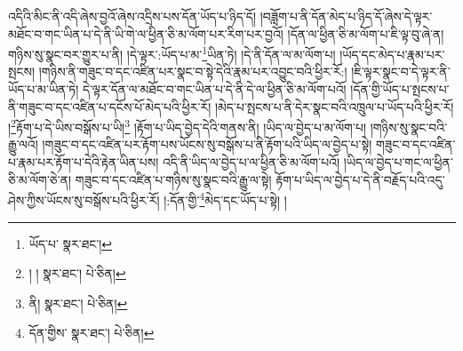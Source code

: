 འདིའི་མིང་ནི་འདི་ཞེས་བྱའོ་ཞེས་འདྲིས་པས་དོན་ཡོད་པ་ཉིད་དོ། །བཟློག་པ་ནི་དོན་མེད་པ་ཉིད་དོ་ཞེས་དེ་ལྟར་མཐོང་བ་གང་ཡིན་པ་དེ་ནི་ཡི་གེ་ལ་ཕྱིན་ཅི་མ་ལོག་པར་རིག་པར་བྱའོ། །དོན་ལ་ཕྱིན་ཅི་མ་ལོག་པ་ཇི་ལྟ་བུ་ཞེ་ན། གཉིས་སུ་སྣང་བར་གྱུར་པ་ནི། །དེ་ལྟར་:ཡོད་པ་མ་\footnote{ཡོད་པ་  སྣར་ཐང་། }ཡིན་ཏེ། །དེ་ནི་དོན་ལ་མ་ལོག་པ། །ཡོད་དང་མེད་པ་རྣམ་པར་སྤངས། །གཉིས་ནི་གཟུང་བ་དང་འཛིན་པར་སྣང་བ་སྟེ་དེའི་རྣམ་པར་འབྱུང་བའི་ཕྱིར་རོ:། །ཇི་ལྟར་སྣང་བ་དེ་ལྟར་ནི་ཡོད་པ་མ་ཡིན་ཏེ། དེ་ལྟར་དོན་ལ་མཐོང་བ་གང་ཡིན་པ་དེ་ནི་དེ་ལ་ཕྱིན་ཅི་མ་ལོག་པའོ། །དོན་གྱི་ཡོད་པ་སྤངས་པ་ནི་གཟུང་བ་དང་འཛིན་པ་དངོས་པོ་མེད་པའི་ཕྱིར་རོ། །མེད་པ་སྤངས་པ་ནི་དེར་སྣང་བའི་འཁྲུལ་པ་ཡོད་པའི་ཕྱིར་རོ། །\footnote{། །  སྣར་ཐང་།  པེ་ཅིན། }རྟོག་པ་དེ་ཡིས་བསྒོས་པ་ཡི།\footnote{ནི།  སྣར་ཐང་།  པེ་ཅིན། } །རྟོག་པ་ཡིད་བྱེད་དེའི་གནས་ནི། །ཡིད་ལ་བྱེད་པ་མ་ལོག་པ། །གཉིས་སུ་སྣང་བའི་རྒྱུ་ལའོ། །གཟུང་བ་དང་འཛིན་པར་རྟོག་པས་ཡོངས་སུ་བསྒོས་པ་ནི་རྟོག་པའི་ཡིད་ལ་བྱེད་པ་སྟེ། གཟུང་བ་དང་འཛིན་པ་རྣམ་པར་རྟོག་པ་དེའི་རྟེན་ཡིན་པས། འདི་ནི་ཡིད་ལ་བྱེད་པ་ལ་ཕྱིན་ཅི་མ་ལོག་པའོ། །ཡིད་ལ་བྱེད་པ་གང་ལ་ཕྱིན་ཅི་མ་ལོག་ཅེ་ན། གཟུང་བ་དང་འཛིན་པ་གཉིས་སུ་སྣང་བའི་རྒྱུ་ལ་སྟེ། རྟོག་པ་ཡིད་ལ་བྱེད་པ་དེ་ནི་བརྗོད་པའི་འདུ་ཤེས་ཀྱིས་ཡོངས་སུ་བསྒོས་པའི་ཕྱིར་རོ། །:དོན་གྱི་\footnote{དོན་གྱིས་  སྣར་ཐང་།  པེ་ཅིན། }མེད་དང་ཡོད་པ་སྟེ། །
